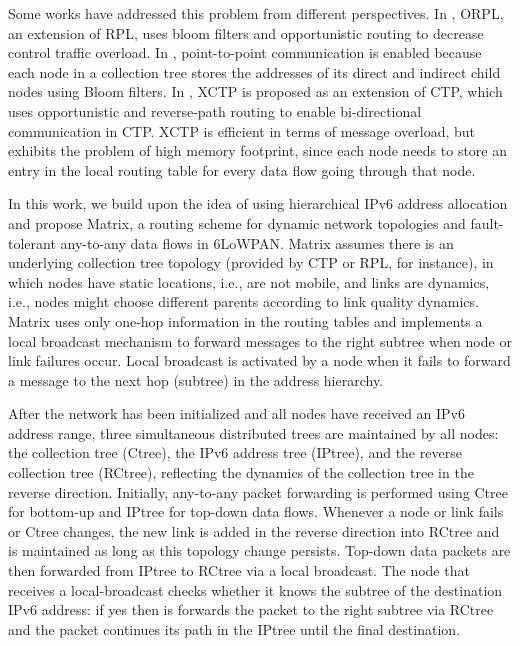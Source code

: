 Some works have addressed this problem from different perspectives. In \cite{Duque13}, ORPL, an extension of RPL, uses bloom filters and opportunistic routing to decrease control traffic overload. In \cite{Rein12}, point-to-point communication is enabled because each node in a collection tree stores the addresses of its direct and indirect
child nodes using Bloom filters. In \cite{xctp}, XCTP is proposed as an extension of CTP, which uses opportunistic and reverse-path routing to enable bi-directional communication  in CTP. XCTP is efficient in terms of message overload, but exhibits the problem of high memory footprint, since each node needs to store an entry in the local routing table for every data flow going through that node. 

In this work, we build upon the idea of using hierarchical IPv6 address allocation and propose Matrix, a routing scheme for dynamic network topologies and fault-tolerant any-to-any data flows in 6LoWPAN. Matrix assumes there is an underlying collection tree topology (provided by CTP or RPL, for instance), in which nodes have static locations, i.e., are not mobile, and links are dynamics, i.e., nodes might choose different parents according to link quality dynamics. Matrix uses only one-hop information in the routing tables and implements a local broadcast mechanism to forward messages to the right subtree when node or link failures occur. Local broadcast is activated by a node when it fails to forward a message to the next hop (subtree) in the address hierarchy.

After the network has been initialized and all nodes have received an IPv6 address range, three simultaneous distributed trees are maintained by all nodes: the collection tree (Ctree), the IPv6 address tree (IPtree), and the reverse collection tree (RCtree), reflecting the dynamics of the collection tree in the reverse direction. Initially, any-to-any packet forwarding is performed using Ctree for bottom-up and IPtree for top-down data flows. Whenever a node or link fails or Ctree changes, the new link is added in the reverse direction into RCtree and is maintained as long as this topology change persists. Top-down data packets are then forwarded from IPtree to RCtree via a local broadcast. The node that receives a local-broadcast checks whether it knows the subtree of the destination IPv6 address: if yes then is forwards the packet to the right subtree via RCtree and the packet continues its path in the IPtree until the final destination.

